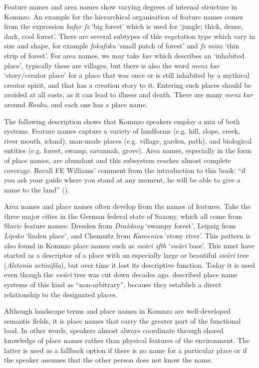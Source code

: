 Feature names and area names show varying degrees of internal structure in Komnzo. An example for the hierarchical organisation of feature names comes from the expression \textit{kafar fz} `big forest' which is used for `jungle; thick, dense, dark, cool forest'. There are several subtypes of this vegetation type which vary in size and shape, for example \textit{fokufoku} `small patch of forest’ and \textit{fz minz} `thin strip of forest’. For area names, we may take \textit{kar} which describes an `inhabited place', typically these are villages, but there is also the word \textit{menz kar} `story/creator place' for a place that was once or is still inhabited by a mythical creator spirit, and that has a creation story to it. Entering such places should be avoided at all costs, as it can lead to illness and death. There are many \textit{menz kar} around \textit{Rouku}, and each one has a place name.

The following description shows that Komnzo speakers employ a mix of both systems. Feature names capture a variety of landforms (e.g. hill, slope, creek, river mouth, island), man-made places (e.g. village, garden, path), and biological entities (e.g. forest, swamp, savannah, grove). Area names, especially in the form of place names, are abundant and this subsystem reaches almost complete coverage. Recall FE Williams' comment from the introduction to this book: ``if you ask your guide where you stand at any moment, he will be able to give a name to the land'' (\citeyear[207]{Williams:1936hb}).

Area names and place names often develop from the names of features. Take the three major cities in the German federal state of Saxony, which all come from Slavic feature names: Dresden from \textit{Draždany} `swampy forest', Leipzig from \textit{Lipsko} `linden place', and Chemnitz from \textit{Kamenica} `stony river'. This pattern is also found in Komnzo place names such as \textit{swäri zfth} ‘\textit{swäri} base’. This must have started as a descriptor of a place with an especially large or beautiful \textit{swäri} tree (\textit{Alstonia actinifila}), but over time it lost its descriptive function. Today it is used even though the \textit{swäri} tree was cut down decades ago. \textcite{Merlan:2001it} described place name systems of this kind as ``non-arbitrary'', because they establish a direct relationship to the designated places.

Although landscape terms and place names in Komnzo are well-developed semantic fields, it is place names that carry the greater part of the functional load. In other words, speakers almost always coordinate through shared knowledge of place names rather than physical features of the environment. The latter is used as a fallback option if there is no name for a particular place or if the speaker assumes that the other person does not know the name.

